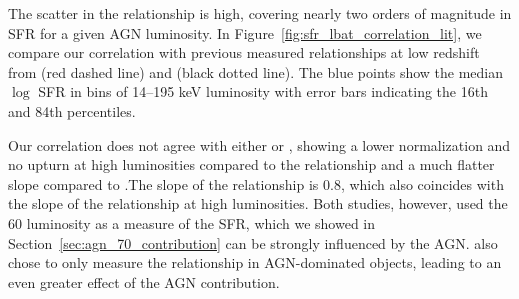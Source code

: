 \documentclass[fleqn, usenatbib]{mnras}
\newcommand{\herschel}{\emph{Herschel}}
\begin{document}



The scatter in the relationship is high, covering nearly two orders of magnitude in SFR for a given AGN luminosity. In Figure~\ref{fig:sfr_lbat_correlation_lit}, we compare our correlation with previous measured relationships at low redshift from \citet{Rosario:2012fr} (red dashed line) and \citet{Netzer:2009lr} (black dotted line). The blue points show the median $\log$ SFR in bins of 14--195 keV luminosity with error bars indicating the 16th and 84th percentiles. 

Our correlation does not agree with either \citet{Rosario:2012fr} or \citet{Netzer:2009lr}, showing a lower normalization and no upturn at high luminosities compared to the \citet{Rosario:2012fr} relationship and a much flatter slope compared to \citet{Netzer:2009lr}.The slope of the \citet{Netzer:2009lr} relationship is 0.8, which also coincides with the slope of the \citet{Rosario:2012fr} relationship at high luminosities. Both studies, however, used the 60 \micron{} luminosity as a measure of the SFR, which we showed in Section~\ref{sec:agn_70_contribution} can be strongly influenced by the AGN. \citet{Netzer:2009lr} also chose to only measure the relationship in AGN-dominated objects, leading to an even greater effect of the AGN contribution. 
\end{document}
